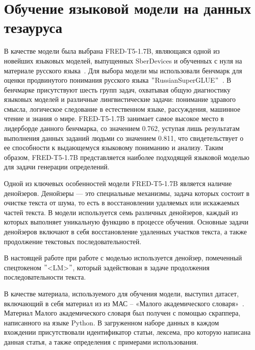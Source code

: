 \documentclass[LI,VKR]{HSEUniversity}
\begin{document}
\section{Обучение языковой модели на данных тезауруса}

В качестве модели была выбрана FRED-T5-1.7B, являющаяся одной из новейших языковых моделей,
выпущенных SberDevices и обученных с нуля на материале русского языка~\cite{FRED-T5}.
Для выбора модели мы использовали бенчмарк для оценки продвинутого понимания русского языка
\("\)RussianSuperGLUE\("\)~\cite{RussianSuperGLUE}.
В бенчмарке присутствуют шесть групп задач, охватывая
общую диагностику языковых моделей и различные лингвистические задачи:
понимание здравого смысла, логическое следование в естественном языке,
рассуждения, машинное чтение и знания о мире.
FRED-T5-1.7B занимает самое высокое место в лидерборде данного бенчмарка, со значением 0.762,
уступая лишь результатам выполнения данных заданий людьми со значением 0.811,
что свидетельствует о ее способности к выдающемуся языковому пониманию и анализу.
Таким образом, FRED-T5-1.7B представляется наиболее подходящей языковой моделью
для задачи генерации определений.

Одной из ключевых особенностей модели FRED-T5-1.7B является наличие денойзеров.
Денойзеры — это специальные механизмы, задача которых состоит в очистке текста от шума,
то есть в восстановлении удаляемых или искажаемых частей текста.
В модели используется семь различных денойзеров, каждый из которых выполняет
уникальную функцию в процессе обучения.
Основные задачи денойзеров включают в себя восстановление
удаленных участков текста, а также продолжение текстовых последовательностей.

В настоящей работе при работе с моделью используется денойзер,
помеченный спецтокеном \("\)<LM>\("\),
который задействован в задаче продолжения последовательности текста.

В качестве материала, используемого для обучения модели, выступил датасет,
включающий в себя материал из из МАС – «Малого академического словаря»~\cite{MAS1981}.
Материал Малого академического словаря был получен с помощью скраппера, написанного на языке Python.
В загруженном наборе данных в каждом вхождении присутствовали
идентификатор статьи, лексема, про которую написана данная статья, а также определения
с примерами использования.
\end{document}
